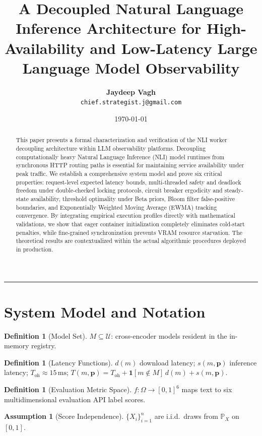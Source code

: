 \documentclass[11pt,a4paper]{article}
\theoremstyle{plain}
\theoremstyle{definition}
\newtheorem{definition}[theorem]{Definition}
\newtheorem{assumption}[theorem]{Assumption}
\theoremstyle{remark}
\newcommand{\Prob}{\mathbb{P}}
\begin{document}
\title{\textbf{A Decoupled Natural Language Inference Architecture for High-Availability and Low-Latency Large Language Model Observability}}
\author{\textbf{Jaydeep Vagh}\\
        {\small \texttt{chief.strategist.j@gmail.com}}}
\date{\today}
\maketitle\tableofcontents\bigskip\hrule

\begin{abstract}
This paper presents a formal characterization and verification of the NLI worker decoupling architecture within LLM observability platforms. Decoupling computationally heavy Natural Language Inference (NLI) model runtimes from synchronous HTTP routing paths is essential for maintaining service availability under peak traffic. We establish a comprehensive system model and prove six critical properties: request-level expected latency bounds, multi-threaded safety and deadlock freedom under double-checked locking protocols, circuit breaker ergodicity and steady-state availability, threshold optimality under Beta priors, Bloom filter false-positive boundaries, and Exponentially Weighted Moving Average (EWMA) tracking convergence. By integrating empirical execution profiles directly with mathematical validations, we show that eager container initialization completely eliminates cold-start penalties, while fine-grained synchronization prevents VRAM resource starvation. The theoretical results are contextualized within the actual algorithmic procedures deployed in production.
\end{abstract}

\section{System Model and Notation}\label{sec:model}
\begin{definition}[Model Set]
$M\subseteq\mathcal{U}$: cross-encoder models resident in the in-memory registry.
\end{definition}
\begin{definition}[Latency Functions]\label{def:latency}
$d(m)$ download latency; $s(m,\mathbf{p})$ inference latency;
$T_{\mathrm{oh}}\approx15\,\mathrm{ms}$;
$T(m,\mathbf{p})=T_{\mathrm{oh}}+\mathbf{1}[m\notin M]\,d(m)+s(m,\mathbf{p})$.
\end{definition}
\begin{definition}[Evaluation Metric Space]
$f:\Omega\to[0,1]^6$ maps text to six multidimensional evaluation API label scores.
\end{definition}
\begin{assumption}[Score Independence]\label{ass:indep}
$\{X_i\}_{i=1}^n$ are i.i.d.\ draws from $\Prob_X$ on $[0,1]$.
\end{assumption}
\end{document}
